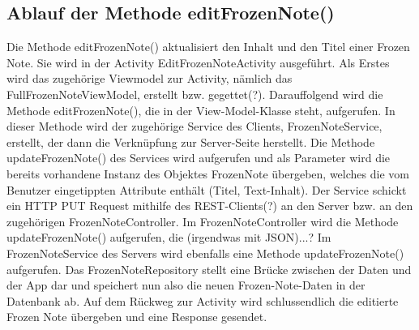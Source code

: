 \subsection{Ablauf der Methode editFrozenNote()}

Die Methode editFrozenNote() aktualisiert den Inhalt und den Titel einer Frozen Note. Sie wird in der Activity EditFrozenNoteActivity ausgeführt. Als Erstes wird das zugehörige Viewmodel zur Activity, nämlich das FullFrozenNoteViewModel, erstellt bzw. gegettet(?). Darauffolgend wird die Methode editFrozenNote(), die in der View-Model-Klasse steht, aufgerufen. In dieser Methode wird der zugehörige Service des Clients, FrozenNoteService, erstellt, der dann die Verknüpfung zur Server-Seite herstellt. Die Methode updateFrozenNote() des Services wird aufgerufen und als Parameter wird die bereits vorhandene Instanz des Objektes FrozenNote übergeben, welches die vom Benutzer eingetippten Attribute enthält (Titel, Text-Inhalt). Der Service schickt ein HTTP PUT Request mithilfe des REST-Clients(?) an den Server bzw. an den zugehörigen FrozenNoteController. Im FrozenNoteController wird die Methode updateFrozenNote() aufgerufen, die (irgendwas mit JSON)...? Im FrozenNoteService des Servers wird ebenfalls eine Methode updateFrozenNote() aufgerufen. Das FrozenNoteRepository stellt eine Brücke zwischen der Daten und der App dar und speichert nun also die neuen Frozen-Note-Daten in der Datenbank ab. Auf dem Rückweg zur Activity wird schlussendlich die editierte Frozen Note übergeben und eine Response gesendet.